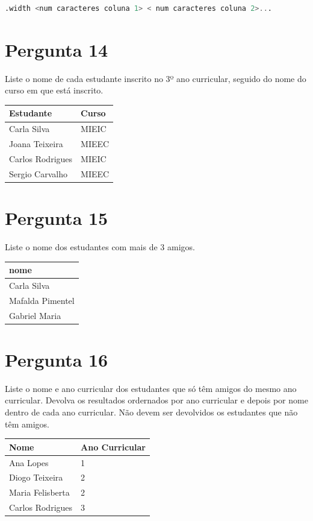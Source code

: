 \begin{lstlisting}[language=SQL,numbers=none]
.width <num caracteres coluna 1> < num caracteres coluna 2>...
\end{lstlisting}

\section{Pergunta 14}
Liste o nome de cada estudante inscrito no 3º ano curricular, seguido do nome do curso em que está inscrito.
\begin{center} \begin{tabular}{l | l}
    \textbf{Estudante} & \textbf{Curso} \\ \hline
    Carla Silva        & MIEIC          \\
    Joana Teixeira     & MIEEC          \\
    Carlos Rodrigues   & MIEIC          \\
    Sergio Carvalho    & MIEEC
\end{tabular} \end{center}
\ansseparator


\section{Pergunta 15}
Liste o nome dos estudantes com mais de 3 amigos.
\begin{center} \begin{tabular}{l}
    \textbf{nome}    \\ \hline
    Carla Silva      \\
    Mafalda Pimentel \\
    Gabriel Maria
\end{tabular} \end{center}


\section{Pergunta 16}
Liste o nome e ano curricular dos estudantes que só têm amigos do mesmo ano curricular. Devolva os resultados ordernados por ano curricular e depois por nome dentro de cada ano curricular. Não devem ser devolvidos os estudantes que não têm amigos.
\begin{center} \begin{tabular}{l | l}
    \textbf{Nome}    & \textbf{Ano Curricular} \\ \hline
    Ana Lopes        & 1                       \\
    Diogo Teixeira   & 2                       \\
    Maria Felisberta & 2                       \\
    Carlos Rodrigues & 3
\end{tabular} \end{center}


